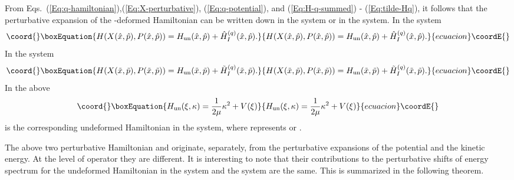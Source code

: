 \documentclass[a4paper,12pt]{article}
\begin{document}
From Eqs.~(\ref{Eq:q-hamiltonian}),(\ref{Eq:X-perturbative}),
 (\ref{Eq:q-potential}), and (\ref{Eq:H-q-summed}) -
(\ref{Eq:tilde-Hq}),
it follows that the perturbative expansion of the \coordHE{}-deformed Hamiltonian 
\coordHE{} can be written down in the  \coordHE{} system 
or in the \coordHE{} system. In  the  \coordHE{} system 
\begin{equation}\coord{}\boxEquation{                         
\label{Eq:hat-H}  
H(X(\hat x,\hat p),P(\hat x,\hat p))=H_{\rm un}(\hat x,\hat p)+
\hat H^{(q)}_I (\hat x,\hat p).
}{                         
H(X(\hat x,\hat p),P(\hat x,\hat p))=H_{\rm un}(\hat x,\hat p)+
\hat H^{(q)}_I (\hat x,\hat p).
}{ecuacion}\coordE{}\end{equation}
In the  \coordHE{} system
\begin{equation}\coord{}\boxEquation{                         
\label{Eq:tilde-H}  
H(X(\tilde x,\tilde p),P(\tilde x,\tilde p))=H_{\rm un}(\tilde x,\tilde p)
+\tilde H^{(q)}_I (\tilde x,\tilde p).
}{                         
H(X(\tilde x,\tilde p),P(\tilde x,\tilde p))=H_{\rm un}(\tilde x,\tilde p)
+\tilde H^{(q)}_I (\tilde x,\tilde p).
}{ecuacion}\coordE{}\end{equation}
In the above
\begin{equation}\coord{}\boxEquation{                          
\label{Eq:xi-Hun}  
H_{\rm un}(\xi,\kappa)=\frac{1}{2\mu}\kappa^{2}+V(\xi)
}{                          
H_{\rm un}(\xi,\kappa)=\frac{1}{2\mu}\kappa^{2}+V(\xi)
}{ecuacion}\coordE{}\end{equation}
is the corresponding undeformed Hamiltonian in the \myHighlight{$(\xi,\kappa)$}\coordHE{} system,
where \myHighlight{$(\xi,\kappa)$}\coordHE{} represents 
\coordHE{} or \coordHE{}. 

The above two perturbative Hamiltonian \coordHE{} and 
\coordHE{} originate,  separately, from the 
perturbative expansions  of the potential and the kinetic energy.
At the level of operator they are different.
 It is interesting to note that their contributions to the perturbative
 shifts of energy spectrum for the undeformed  Hamiltonian in the
 \coordHE{} system and the \coordHE{}  system  are the same.
 This is summarized in the following theorem.
\end{document}
